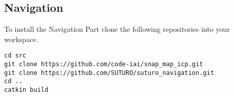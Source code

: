 \documentclass[main.tex]{subfiles}
\begin{document}
\subsection{Navigation}
To install the Navigation Part clone the following repositories into your workspace.	
\begin{lstlisting}
cd src
git clone https://github.com/code-iai/snap_map_icp.git
git clone https://github.com/SUTURO/suturo_navigation.git
cd ..
catkin build  \end{lstlisting}
\end{document}
